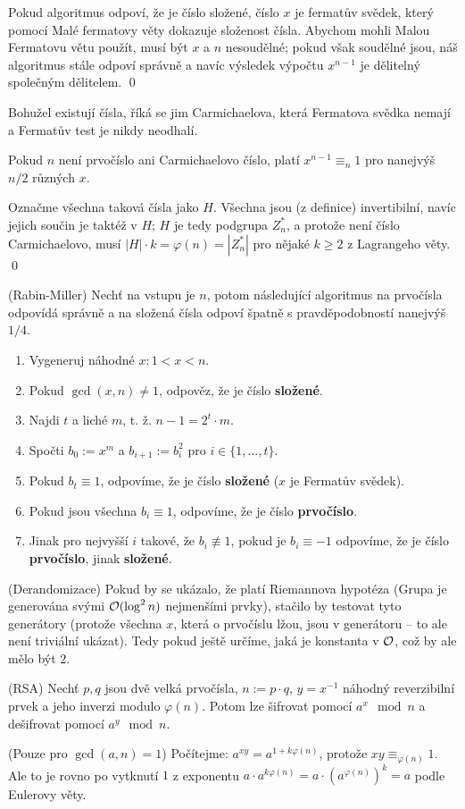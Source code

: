 \dk Pokud algoritmus odpoví, že je číslo složené, číslo $x$ je fermatův svědek,
který pomocí Malé fermatovy věty dokazuje složenost čísla. Abychom mohli Malou
Fermatovu větu použít, musí být $x$ a $n$ nesoudělné; pokud však soudělné jsou,
náš algoritmus stále odpoví správně a navíc výsledek výpočtu $x^{n-1}$ je
dělitelný společným dělitelem. \qed

\poz Bohužel existují čísla, říká se jim Carmichaelova, která Fermatova svědka
nemají a Fermatův test je nikdy neodhalí.

\vt Pokud $n$ není prvočíslo ani Carmichaelovo číslo, platí $x^{n-1} \equiv_n
1$ pro nanejvýš $n/2$ různých $x$.

\dk Označme všechna taková čísla jako $H$. Všechna jsou (z definice)
invertibilní, navíc jejich součin je taktéž v $H$; $H$ je tedy podgrupa $Z_n^*$,
a protože není číslo Carmichaelovo, musí $|H| \cdot k = \varphi(n) = |Z_n^*|$
pro nějaké $k \geq 2$ z Lagrangeho věty. \qed

\alg (Rabin-Miller) Nechť na vstupu je $n$, potom následující algoritmus na
prvočísla odpovídá správně a na složená čísla odpoví špatně s pravděpodobností
nanejvýš $1/4$.
\begin{enumerate}
	\item Vygeneruj náhodné $x: 1 < x < n$.
	\item Pokud $\gcd(x,n) \neq 1$, odpověz, že je číslo {\bf složené}.
	\item Najdi $t$ a liché $m$, t. ž. $n-1 = 2^t \cdot m$.
	\item Spočti $b_0 := x^m$ a $b_{i+1} := b_i^2$ pro $i\in \{1, \dots, t\}$.
	\item Pokud $b_t \equiv 1$, odpovíme, že je číslo {\bf složené} ($x$ je
		Fermatův svědek).
	\item Pokud jsou všechna $b_i \equiv 1$, odpovíme, že je číslo {\bf
		prvočíslo}.
	\item Jinak pro nejvyšší $i$ takové, že $b_i \not\equiv 1$, pokud je $b_i
		\equiv -1$ odpovíme, že je číslo {\bf prvočíslo}, jinak {\bf složené}.
\end{enumerate}

\pzn (Derandomizace) Pokud by se ukázalo, že platí Riemannova hypotéza (Grupa je
generována svými $\mathcal{O}(\log^2 n)$ nejmenšími prvky), stačilo by testovat tyto
generátory (protože všechna $x$, která o prvočíslu lžou, jsou v generátoru -- to
ale není triviální ukázat). Tedy pokud ještě určíme, jaká je konstanta v $\mathcal{O}$,
což by ale mělo být $2$.

\alg (RSA) Nechť $p,q$ jsou dvě velká prvočísla, $n := p \cdot q$, $y = x^{-1}$
náhodný reverzibilní prvek a jeho inverzi modulo $\varphi(n)$. Potom lze
šifrovat pomocí $a^x \mod n$ a dešifrovat pomocí $a^y \mod n$.

\dk (Pouze pro $\gcd(a,n) = 1$) Počítejme: $a^{xy} = a^{1 + k\varphi(n)}$,
protože $xy \equiv_{\varphi(n)} 1$. Ale to je rovno po vytknutí $1$ z exponentu
$a \cdot a^{k\varphi(n)} = a \cdot (a^{\varphi(n)})^k = a$ podle Eulerovy věty.
